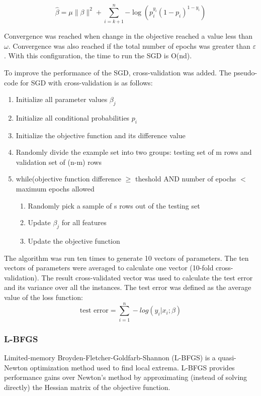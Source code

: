 \documentclass[10pt]{article}
\begin{document}
\begin{equation}
    \widehat{\beta} = \mu \|\beta\|^2 + \sum_{i=k+1}^{n}{-\log(p_i^{y_i}(1 - p_i)^{1-y_i})}
\end{equation}

Convergence was reached when change in the objective reached a value less than $\omega$. Convergence was also reached if the total number of epochs was greater than $\varepsilon$. With this configuration, the time to run the SGD is O(nd).

To improve the performance of the SGD, cross-validation was added. The pseudo-code for SGD with cross-validation is as follows:
\begin{enumerate}
    \item Initialize all parameter values $\beta_j$
    \item Initialize all conditional probabilities $p_i$
    \item Initialize the objective function and its difference value
    \item Randomly divide the example set into two groups: testing set of m rows and validation set of (n-m) rows
    \item while(objective function difference $\geq$ theshold AND number of epochs $<$ maximum epochs allowed
    \begin{enumerate}
        \item Randomly pick a sample of s rows out of the testing set
        \item Update $\beta_j$ for all features
        \item Update the objective function
    \end{enumerate}
\end{enumerate}

The algorithm was run ten times to generate 10 vectors of parameters. The ten vectors of parameters were averaged to calculate one vector (10-fold cross-validation). The result cross-validated vector was used to calculate the test error and its variance over all the instances. The test error was defined as the average value of the loss function:
\begin{equation}
        \textrm{test error} = \sum_{i=1}^{n} -log(y_i | x_i ; \beta )
\end{equation}


\subsubsection{L-BFGS}
Limited-memory Broyden-Fletcher-Goldfarb-Shannon (L-BFGS) is a quasi-Newton optimization method used to find local extrema. L-BFGS provides performance gains over Newton's method by approximating (instead of solving directly) the Hessian matrix of the objective function.
\end{document}
